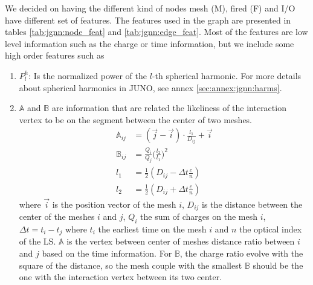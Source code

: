 \documentclass[../main.tex]{subfiles}
\begin{document}
We decided on having the different kind of nodes {\color{Dandelion} mesh (M)}, {\color{red} fired (F)} and {\color{blue} I/O} have different set of features. The features used in the graph are presented in tables \ref{tab:jgnn:node_feat} and \ref{tab:jgnn:edge_feat}. Most of the features are low level information such as the charge or time information, but we include some high order features such as
\begin{enumerate}
  \item $P^h_l$: Is the normalized power of the $l$-th spherical harmonic. For more details about spherical harmonics in JUNO, see annex \ref{sec:annex:jgnn:harms}.
  \item $\mathbb{A}$ and $\mathbb{B}$ are information that are related the likeliness of the interaction vertex to be on the segment between the center of two meshes.
    \begin{align}
      \mathbb{A}_{ij} &= (\vec{j} - \vec{i})\cdot\frac{l_1}{D_{ij}} + \vec{i} \\
      \mathbb{B}_{ij} &= \frac{Q_i}{Q_j} \bigg(\frac{l_2}{l_1}\bigg)^2 \\
      l_1 &= \frac{1}{2}(D_{ij} - \Delta t \frac{c}{n}) \\
      l_2 &= \frac{1}{2}(D_{ij} + \Delta t \frac{c}{n})
    \end{align}
    where $\vec{i}$ is the position vector of the mesh $i$, $D_{ij}$ is the distance between the center of the meshes $i$ and $j$, $Q_i$ the sum of charges on the mesh $i$, $\Delta t = t_i - t_j$ where $t_i$ the earliest time on the mesh $i$ and $n$ the optical index of the LS. $\mathbb{A}$ is the vertex between center of meshes distance ratio between $i$ and $j$ based on the time information. For $\mathbb{B}$, the charge ratio evolve with the square of the distance, so the mesh couple with the smallest $\mathbb{B}$ should be the one with the interaction vertex between its two center.
\end{enumerate}
\end{document}
